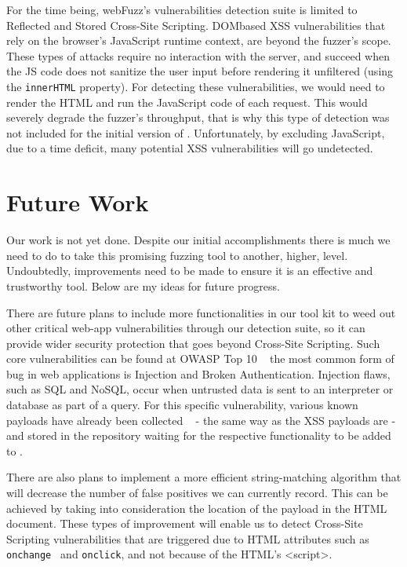 For the time being, webFuzz's vulnerabilities detection suite is limited to Reflected and Stored Cross-Site Scripting. DOMbased XSS vulnerabilities that rely on the browser's JavaScript runtime context, are beyond the fuzzer's scope. These types of attacks require no interaction with
the server, and succeed when the JS code does not sanitize the user input before rendering it unfiltered (\eg using the {\tt innerHTML} property). For detecting these vulnerabilities, we would need to render the HTML and run the JavaScript code of each request. This would severely degrade the fuzzer's throughput, that is why this type of detection was not included for the initial version of \pname{}.  Unfortunately, by excluding JavaScript, due to a time deficit, many potential XSS vulnerabilities will go undetected.

\section{Future Work}
Our work is not yet done. Despite our initial accomplishments there is much we need to do to take this promising fuzzing tool to another, higher, level. Undoubtedly, improvements need to be made to ensure it is an effective and trustworthy tool. Below are my ideas for future progress.

There are future plans to include more functionalities in our tool kit to weed out other critical web-app vulnerabilities through our detection suite, so it can provide wider security protection that goes beyond Cross-Site Scripting. Such core vulnerabilities can be found at OWASP Top 10 ~\cite{owasp2017} the most common form of bug in web applications is Injection and Broken Authentication. Injection flaws, such as SQL and NoSQL, occur when untrusted data is sent to an interpreter or database as part of a query. For this specific vulnerability, various known payloads have already been collected ~\cite{seclist} - the same way as the XSS payloads are - and stored in the repository waiting for the respective functionality to be added to \pname{}.

There are also plans to implement a more efficient string-matching algorithm that will decrease the number of false positives we can currently record. This can be achieved by taking into consideration the location of the payload in the HTML document. These types of improvement will enable us to detect Cross-Site Scripting vulnerabilities that are triggered due to HTML attributes such as {\tt onchange } and {\tt onclick}, and not because of the HTML's <script>.

